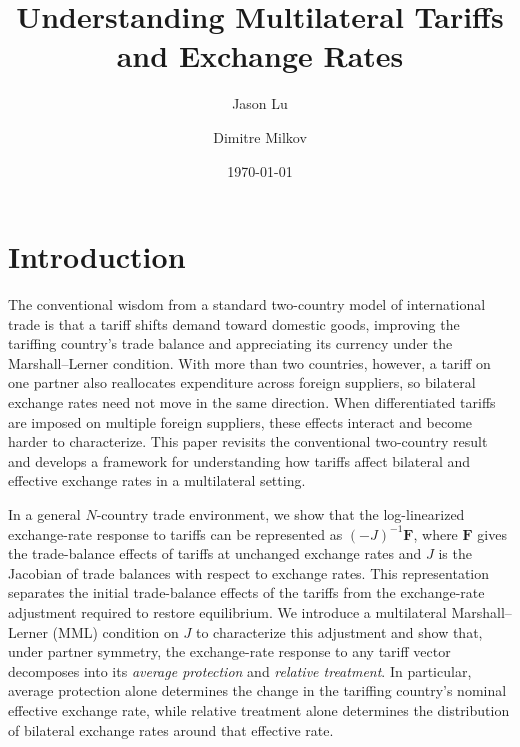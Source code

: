 \documentclass[11pt]{article}
\title{Understanding Multilateral Tariffs and Exchange Rates}
\author{Jason Lu \and Dimitre Milkov}
\date{\today}
\begin{document}
\maketitle

\section{Introduction}

The conventional wisdom from a standard two-country model of international trade is that a tariff shifts demand toward domestic goods, improving the tariffing country's trade balance and appreciating its currency under the Marshall--Lerner condition. With more than two countries, however, a tariff on one partner also reallocates expenditure across foreign suppliers, so bilateral exchange rates need not move in the same direction. When differentiated tariffs are imposed on multiple foreign suppliers, these effects interact and become harder to characterize. This paper revisits the conventional two-country result and develops a framework for understanding how tariffs affect bilateral and effective exchange rates in a multilateral setting.

In a general $N$-country trade environment, we show that the log-linearized exchange-rate response to tariffs can be represented as $(-J)^{-1}\boldsymbol{F}$, where $\boldsymbol{F}$ gives the trade-balance effects of tariffs at unchanged exchange rates and $J$ is the Jacobian of trade balances with respect to exchange rates. This representation separates the initial trade-balance effects of the tariffs from the exchange-rate adjustment required to restore equilibrium. We introduce a multilateral Marshall--Lerner (MML) condition on $J$ to characterize this adjustment and show that, under partner symmetry, the exchange-rate response to any tariff vector decomposes into its \emph{average protection} and \emph{relative treatment}. In particular, average protection alone determines the change in the tariffing country's nominal effective exchange rate, while relative treatment alone determines the distribution of bilateral exchange rates around that effective rate.
\end{document}

